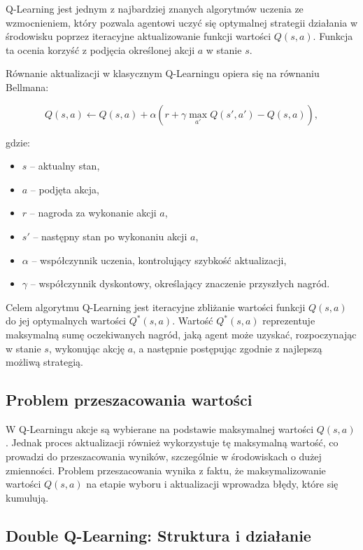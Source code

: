 Q-Learning jest jednym z najbardziej znanych algorytmów uczenia ze wzmocnieniem, który pozwala agentowi uczyć się optymalnej strategii działania w środowisku poprzez iteracyjne aktualizowanie funkcji wartości \(Q(s, a)\). Funkcja ta ocenia korzyść z podjęcia określonej akcji \(a\) w stanie \(s\).

Równanie aktualizacji w klasycznym Q-Learningu opiera się na równaniu Bellmana:

\[
	Q(s, a) \leftarrow Q(s, a) + \alpha \left( r + \gamma \max_{a'} Q(s', a') - Q(s, a) \right),
\]

gdzie:
\begin{itemize}
	\item \(s\) – aktualny stan,
	\item \(a\) – podjęta akcja,
	\item \(r\) – nagroda za wykonanie akcji \(a\),
	\item \(s'\) – następny stan po wykonaniu akcji \(a\),
	\item \(\alpha\) – współczynnik uczenia, kontrolujący szybkość aktualizacji,
	\item \(\gamma\) – współczynnik dyskontowy, określający znaczenie przyszłych nagród.
\end{itemize}

Celem algorytmu Q-Learning jest iteracyjne zbliżanie wartości funkcji \(Q(s, a)\) do jej optymalnych wartości \(Q^*(s, a)\). Wartość \(Q^*(s, a)\) reprezentuje maksymalną sumę oczekiwanych nagród, jaką agent może uzyskać, rozpoczynając w stanie \(s\), wykonując akcję \(a\), a następnie postępując zgodnie z najlepszą możliwą strategią.

\subsection{Problem przeszacowania wartości}

W Q-Learningu akcje są wybierane na podstawie maksymalnej wartości \(Q(s, a)\). Jednak proces aktualizacji również wykorzystuje tę maksymalną wartość, co prowadzi do przeszacowania wyników, szczególnie w środowiskach o dużej zmienności. Problem przeszacowania wynika z faktu, że maksymalizowanie wartości \(Q(s, a)\) na etapie wyboru i aktualizacji wprowadza błędy, które się kumulują.

\subsection{Double Q-Learning: Struktura i działanie}

